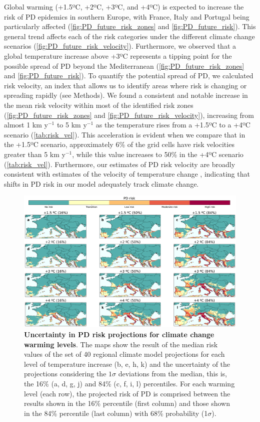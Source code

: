 Global warming (+1.5ºC, +2ºC, +3ºC, and +4ºC) is expected to increase the
risk of PD epidemics in southern Europe, with France, Italy and Portugal being
particularly affected (\cref{fig:PD_future_risk_zones} and
\cref{fig:PD_future_risk}). This general trend affects each of the risk
categories under the different climate change scenarios
(\cref{fig:PD_future_risk_velocity}). Furthermore, we observed that a global
temperature increase above +3ºC represents a tipping point for the possible
spread of PD beyond the Mediterranean (\cref{fig:PD_future_risk_zones} and
\cref{fig:PD_future_risk}). To quantify the potential spread of PD, we
calculated risk velocity, an index that allows us to identify areas where risk
is changing  or spreading rapidly (see Methods). We found a consistent and
notable increase in the mean risk velocity within most of the identified risk
zones (\cref{fig:PD_future_risk_zones} and \cref{fig:PD_future_risk_velocity}),
increasing from almost 1 km y$^{-1}$ to 5
km y$^{-1}$ as the temperature rises from a +1.5ºC to a +4ºC scenario
(\cref{tab:risk_vel}). This acceleration is evident when we
compare that in
the +1.5ºC scenario, approximately 6\% of the grid cells have risk velocities
greater than 5 km y$^{\mathrm{-1}}$, while this value increases to 50\% in the
+4ºC scenario (\cref{tab:risk_vel}). Furthermore, our estimates of
PD risk
velocity are broadly consistent with estimates of the velocity of temperature
change \cite{Loarie2009}, indicating that shifts in PD risk in our model
adequately track climate change.

\begin{figure}[t!]
    \centering
    \includegraphics[width=\textwidth]{Figures/Uncertainty.png}
    \caption{\textbf{Uncertainty in PD risk projections for climate change
            warming levels}. The maps show the result of the median risk values
        of the set
        of 40 regional climate model projections for each level of temperature
        increase
        (b, e, h, k) and the uncertainty of the projections considering the $1
            \sigma$
        deviations from the median, this is, the 16\% (a, d, g, j) and 84\% (c,
        f, i,
        l) percentiles. For each warming level (each row), the projected risk
        of PD is
        comprised between the results shown in the 16\% percentile (first
        column) and
        those shown in the 84\% percentile (last column) with 68\% probability
        (1$\sigma$).}
    \label{fig:uncertainty}
\end{figure}

